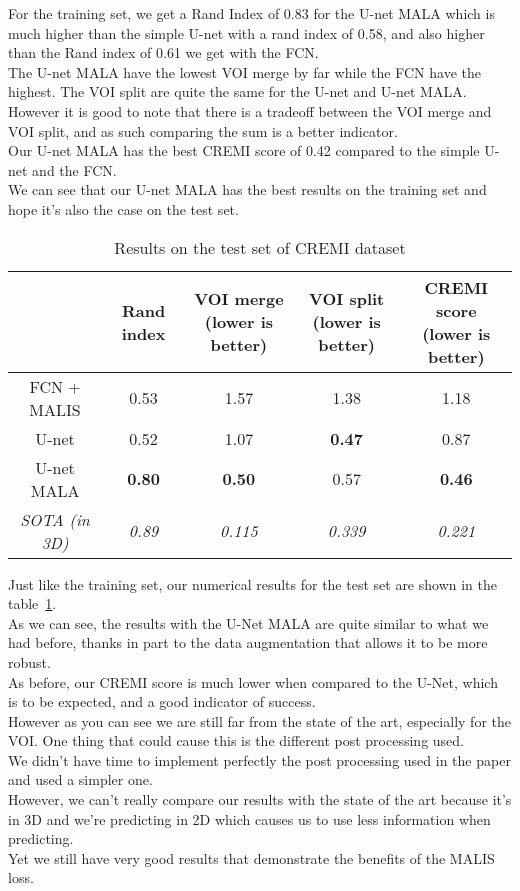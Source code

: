 For the training set, we get a Rand Index of 0.83 for the U-net MALA which is much higher than the simple U-net with a rand index of 0.58, and also higher than the Rand index of 0.61 we get with the FCN.\\
The U-net MALA have the lowest VOI merge by far while the FCN have the highest. The VOI split are quite the same for the U-net and U-net MALA.\\
However it is good to note that there is a tradeoff between the VOI merge and VOI split, and as such comparing the sum is a better indicator.\\
Our U-net MALA has the best CREMI score of 0.42 compared to the simple U-net and the FCN.\\ 
We can see that our U-net MALA has the best results on the training set and hope it’s also the case on the test set.\\

\begin{table}[!htbp]
	\centering
	\begin{tabular}{|c|c|c|c|c|}
		\hline
		& Rand index & \thead{VOI merge \\(lower is better)} & \thead{VOI split\\(lower is better)} & \thead{CREMI score\\(lower is better)}\\
		\hline
		FCN + MALIS & 0.53 & 1.57 & 1.38 & 1.18\\
		\hline
		U-net & 0.52 & 1.07 & \textbf{0.47} & 0.87\\
		\hline
		U-net MALA & \textbf{0.80} & \textbf{0.50} & 0.57 & \textbf{0.46}\\
		\hline
		\hline
		\textit{SOTA (in 3D)} & \textit{0.89} & \textit{0.115} & \textit{0.339}& \textit{0.221}\\
		\hline
	\end{tabular}
	\caption{Results on the test set of CREMI dataset}
\label{tab:cremi_res_test}
\end{table}

Just like the training set, our numerical results for the test set are shown in the table~\ref{tab:cremi_res_test}.\\
As we can see, the results with the U-Net MALA are quite similar to what we had before, thanks in part to the data augmentation that allows it to be more robust.\\
As before, our CREMI score is much lower when compared to the U-Net, which is to be expected, and a good indicator of success.\\

However as you can see we are still far from the state of the art, especially for the VOI. One thing that could cause this is the different post processing used.\\ 
We didn’t have time to implement perfectly the post processing used in the paper and used a simpler one.\\
However, we can’t really compare our results with the state of the art because it’s in 3D and we’re predicting in 2D which causes us to use less information when predicting.\\
Yet we still have very good results that demonstrate the benefits of the MALIS loss.\\

